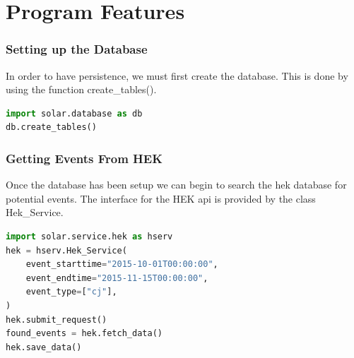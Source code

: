 \documentclass{beamer}
\begin{document}
\begin{frame}[fragile]
\begin{figure}
{
}
\end{figure}
\end{frame}

\section{Program Features}

\begin{frame}[fragile]
    \frametitle{Setting up the Database}
    In order to have persistence, we must first create the database. This is done by using the function create\_tables(). \\

    \begin{lstlisting}[language=Python]
import solar.database as db
db.create_tables()
    \end{lstlisting}

\end{frame}

\begin{frame}[fragile]
    \frametitle{Getting Events From HEK}
    Once the database has been setup we can begin to search the hek database for potential events. The interface for the HEK api is provided by the class Hek\_Service. \\

    \begin{lstlisting}[language=Python]
import solar.service.hek as hserv
hek = hserv.Hek_Service(
    event_starttime="2015-10-01T00:00:00",
    event_endtime="2015-11-15T00:00:00",
    event_type=["cj"],
)
hek.submit_request()
found_events = hek.fetch_data()
hek.save_data()
    \end{lstlisting}

\end{frame}
\end{document}
